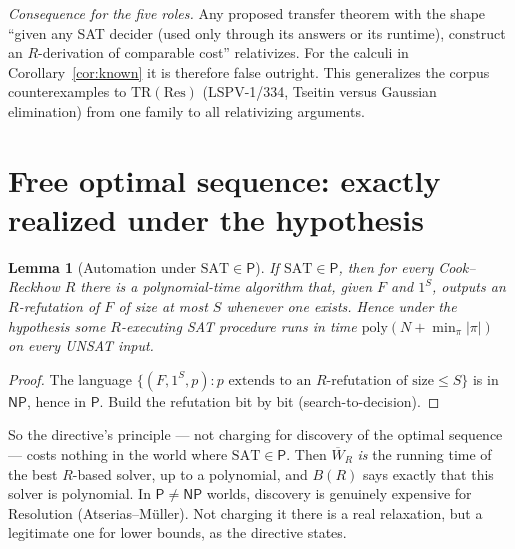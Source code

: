 \documentclass[11pt]{article}
\newtheorem{lemma}[theorem]{Lemma}
\theoremstyle{definition}
\newcommand{\Pclass}{\mathsf{P}}
\newcommand{\NP}{\mathsf{NP}}
\newcommand{\SAT}{\mathrm{SAT}}
\newcommand{\Wb}{\overline W}
\begin{document}
\textit{Consequence for the five roles.} Any proposed transfer theorem with
the shape ``given any SAT decider (used only through its answers or its
runtime), construct an $R$-derivation of comparable cost'' relativizes. For the
calculi in Corollary~\ref{cor:known} it is therefore false outright. This
generalizes the corpus counterexamples to $\mathrm{TR}(\mathrm{Res})$
(LSPV-1/334, Tseitin versus Gaussian elimination) from one family to all
relativizing arguments.

\section{Free optimal sequence: exactly realized under the hypothesis}
\begin{lemma}[Automation under $\SAT\in\Pclass$]\label{lem:auto}
If $\SAT\in\Pclass$, then for every Cook--Reckhow $R$ there is a polynomial-time
algorithm that, given $F$ and $1^S$, outputs an $R$-refutation of $F$ of size
at most $S$ whenever one exists. Hence under the hypothesis some $R$-executing
SAT procedure runs in time $\mathrm{poly}(N+\min_\pi|\pi|)$ on every UNSAT input.
\end{lemma}
\begin{proof}
The language $\{(F,1^S,p):p\text{ extends to an }R\text{-refutation of size}\le S\}$
is in $\NP$, hence in $\Pclass$. Build the refutation bit by bit
(search-to-decision).
\end{proof}

So the directive's principle --- not charging for discovery of the optimal
sequence --- costs nothing in the world where $\SAT\in\Pclass$. Then
$\Wb_R$ \emph{is} the running time of the best $R$-based solver, up to a
polynomial, and $B(R)$ says exactly that this solver is polynomial. In
$\Pclass\ne\NP$ worlds, discovery is genuinely expensive for Resolution
(Atserias--Müller). Not charging it there is a real relaxation, but a legitimate one
for lower bounds, as the directive states.
\end{document}
